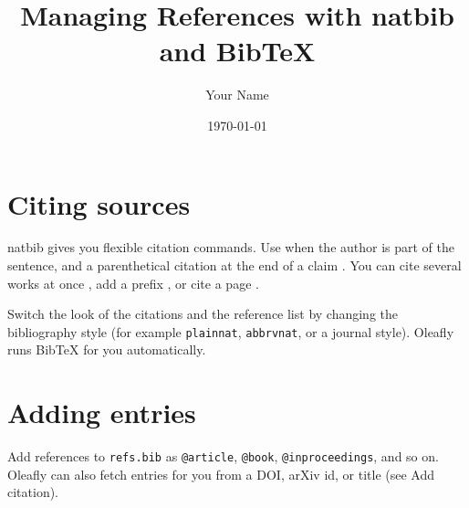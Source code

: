 \documentclass[11pt]{article}
\title{Managing References with natbib and BibTeX}
\author{Your Name}
\date{\today}
\begin{document}
\maketitle

\section{Citing sources}
natbib gives you flexible citation commands. Use \citet{turing1950} when the
author is part of the sentence, and a parenthetical citation at the end of a claim
\citep{shannon1948}. You can cite several works at once
\citep{turing1950,shannon1948,knuth1984}, add a prefix
\citep[see][]{knuth1984}, or cite a page \citep[p.~42]{shannon1948}.

Switch the look of the citations and the reference list by changing the
bibliography style (for example \texttt{plainnat}, \texttt{abbrvnat}, or a journal
style). Oleafly runs BibTeX for you automatically.

\section{Adding entries}
Add references to \texttt{refs.bib} as \texttt{@article}, \texttt{@book},
\texttt{@inproceedings}, and so on. Oleafly can also fetch entries for you from a
DOI, arXiv id, or title (see Add citation).



\end{document}
